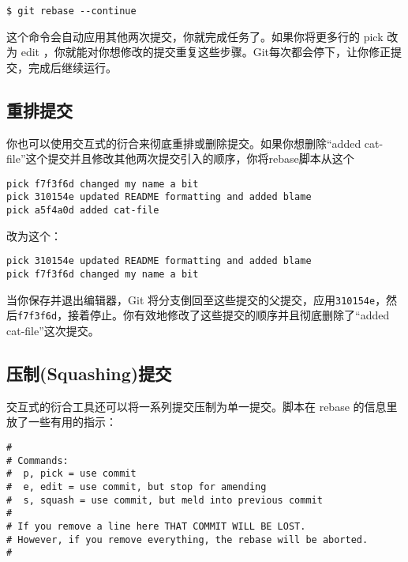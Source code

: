 \documentclass[a4paper]{book}
\begin{document}
\begin{shaded}\begin{verbatim}
$ git rebase --continue
\end{verbatim}\end{shaded}

这个命令会自动应用其他两次提交，你就完成任务了。如果你将更多行的 pick 改为 edit ，你就能对你想修改的提交重复这些步骤。Git每次都会停下，让你修正提交，完成后继续运行。

\subsection{重排提交}

你也可以使用交互式的衍合来彻底重排或删除提交。如果你想删除“added cat-file”这个提交并且修改其他两次提交引入的顺序，你将rebase脚本从这个

\begin{shaded}\begin{verbatim}
pick f7f3f6d changed my name a bit
pick 310154e updated README formatting and added blame
pick a5f4a0d added cat-file
\end{verbatim}\end{shaded}

改为这个：

\begin{shaded}\begin{verbatim}
pick 310154e updated README formatting and added blame
pick f7f3f6d changed my name a bit
\end{verbatim}\end{shaded}

当你保存并退出编辑器，Git 将分支倒回至这些提交的父提交，应用\texttt{310154e}，然后\texttt{f7f3f6d}，接着停止。你有效地修改了这些提交的顺序并且彻底删除了“added cat-file”这次提交。

\subsection{压制(Squashing)提交}

交互式的衍合工具还可以将一系列提交压制为单一提交。脚本在 rebase 的信息里放了一些有用的指示：

\begin{shaded}\begin{verbatim}
#
# Commands:
#  p, pick = use commit
#  e, edit = use commit, but stop for amending
#  s, squash = use commit, but meld into previous commit
#
# If you remove a line here THAT COMMIT WILL BE LOST.
# However, if you remove everything, the rebase will be aborted.
#
\end{verbatim}\end{shaded}
\end{document}
